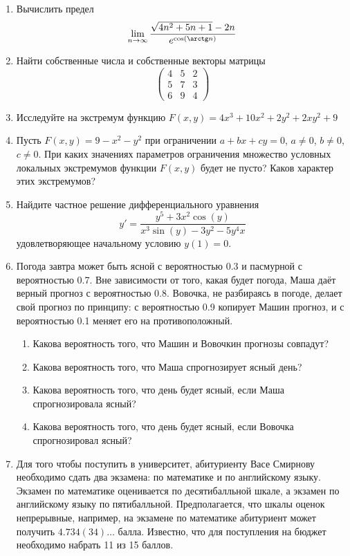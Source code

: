 \documentclass[pdftex,12pt,a4paper]{article}
\begin{document}
\begin{enumerate}

\item Вычислить предел 
\[
\lim_{n\to\infty} \frac{\sqrt{4n^2+5n+1}-2n}{e^{\cos(\arctg n)}}
\]
\item Найти собственные числа и собственные векторы матрицы
\[
\left(
\begin{array}{ccc}
4 & 5 & 2 \\
5 & 7 & 3 \\
6 & 9 & 4
\end{array}
\right)
\]
\item Исследуйте на экстремум функцию $F(x,y)=4x^3+10x^2+2y^2+2xy^2+9$

\item Пусть $F(x,y)=9-x^2-y^2$ при ограничении $a+bx+cy=0$, $a\neq 0$, $b\neq 0$, $c\neq 0$. При каких значениях параметров
ограничения множество условных локальных экстремумов функции $F(x,y)$ будет не
пусто? Каков характер этих экстремумов?

\item  Найдите частное решение дифференциального уравнения 
\[
y'=\frac{y^5+3x^2\cos(y)}{x^3\sin(y)-3y^2-5y^4x}
\]
удовлетворяющее начальному условию $y(1)=0$.

\item Погода завтра может быть ясной с вероятностью 0.3 и пасмурной с вероятностью 0.7.
Вне зависимости от того, какая будет погода, Маша даёт верный прогноз с вероятностью
0.8. Вовочка, не разбираясь в погоде, делает свой прогноз по принципу: с вероятностью
0.9 копирует Машин прогноз, и с вероятностью 0.1 меняет его на противоположный.
\begin{enumerate}
\item Какова вероятность того, что Машин и Вовочкин прогнозы совпадут?
\item Какова вероятность того, что Маша спрогнозирует ясный день?
\item Какова вероятность того, что день будет ясный, если Маша спрогнозировала
ясный?
\item Какова вероятность того, что день будет ясный, если Вовочка спрогнозировал
ясный?
\end{enumerate}


\item Для того чтобы поступить в университет, абитуриенту Васе Смирнову необходимо
сдать два экзамена: по математике и по английскому языку. Экзамен по математике
оценивается по десятибалльной шкале, а экзамен по английскому языку по пятибалльной.
Предполагается, что шкалы оценок непрерывные, например, на экзамене по математике
абитуриент может получить $4.734(34)\ldots$ балла. Известно, что для поступления на бюджет
необходимо набрать 11 из 15 баллов. 



\end{enumerate}
\end{document}
